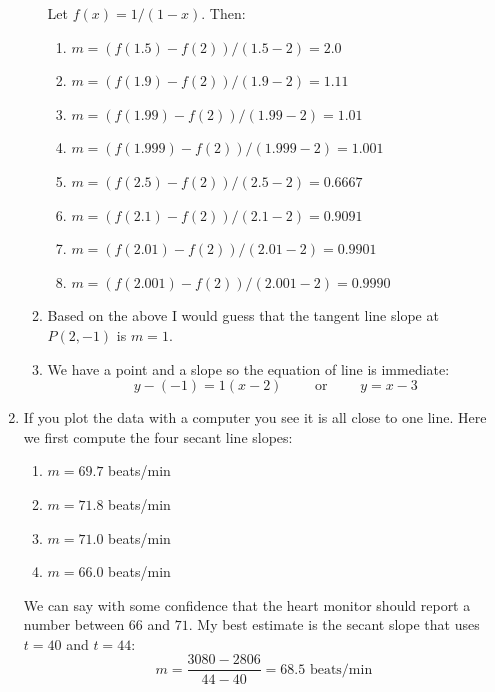\documentclass[11pt]{amsart}
\begin{document}
\begin{enumerate}
\begin{enumerate}
    Let $f(x) = 1/(1-x)$.  Then:
        \renewcommand{\labelenumiii}{(\roman{enumiii})}
        \begin{enumerate}
        \item $m = (f(1.5) - f(2)) / (1.5 - 2) = 2.0$
        \item $m = (f(1.9) - f(2)) / (1.9 - 2) = 1.11$
        \item $m = (f(1.99) - f(2)) / (1.99 - 2) = 1.01$
        \item $m = (f(1.999) - f(2)) / (1.999 - 2) = 1.001$
        \item $m = (f(2.5) - f(2)) / (2.5 - 2) = 0.6667$
        \item $m = (f(2.1) - f(2)) / (2.1 - 2) = 0.9091$
        \item $m = (f(2.01) - f(2)) / (2.01 - 2) = 0.9901$
        \item $m = (f(2.001) - f(2)) / (2.001 - 2) = 0.9990$
        \end{enumerate}
    \item Based on the above I would guess that the tangent line slope at $P(2,-1)$ is $m=1$.
    \item We have a point and a slope so the equation of line is immediate:
        $$y - (-1) = 1 (x - 2) \qquad \text{ or } \qquad y = x -3$$
    \end{enumerate}

\item  If you plot the data with a computer you see it is all close to one line.  Here we first compute the four secant line slopes:

    \renewcommand{\labelenumii}{\alph{enumii})}
    \begin{enumerate}
    \item $m=69.7$ beats/min
    \item $m=71.8$ beats/min
    \item $m=71.0$ beats/min
    \item $m=66.0$ beats/min
    \end{enumerate}

We can say with some confidence that the heart monitor should report a number between $66$ and $71$.  My best estimate is the secant slope that uses $t=40$ and $t=44$:
    $$m = \frac{3080-2806}{44-40} = 68.5 \,\,\text{beats/min}$$
\end{enumerate}
\end{document}
